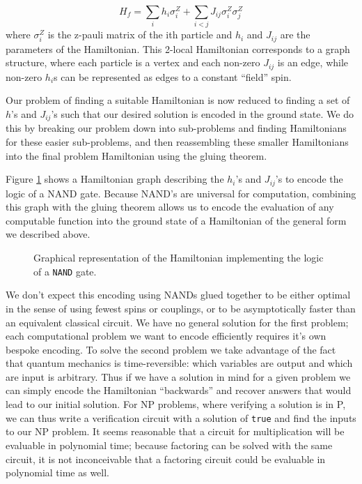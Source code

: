 \begin{displaymath}
	H_f = \sum_{i} h_i \sigma_i^Z + \sum_{i < j} J_{ij} \sigma_i^Z\sigma_j^Z 
\end{displaymath}
where $\sigma_i^Z$ is the z-pauli matrix of the ith particle and $h_i$ and $J_{ij}$ are the parameters of the Hamiltonian.  This 2-local Hamiltonian corresponds to a graph structure, where each particle is a vertex and each non-zero $J_{ij}$ is an edge, while non-zero $h_i$s can be represented as edges to a constant ``field'' spin.

Our problem of finding a suitable Hamiltonian is now reduced to finding a set of $h$'s and $J_{ij}$'s such that our desired solution is encoded in the ground state.  We do this by breaking our problem down into sub-problems and finding Hamiltonians for these easier sub-problems, and then reassembling these smaller Hamiltonians into the final problem Hamiltonian using the gluing theorem.\cite{gluing}

Figure \ref{fig:nand_graph} shows a Hamiltonian graph describing the $h_i$'s and $J_{ij}$'s to encode the logic of a NAND gate.  Because NAND's are universal for computation, combining this graph with the gluing theorem allows us to encode the evaluation of any computable function into the ground state of a Hamiltonian of the general form we described above.  

\begin{figure}
	\caption[\texttt{NAND} Graph]{Graphical representation of the Hamiltonian implementing the logic of a \texttt{NAND} gate.}
	\label{fig:nand_graph}
\end{figure}


We don't expect this encoding using NANDs glued together to be either optimal in the sense of using fewest spins or couplings, or to be asymptotically faster than an equivalent classical circuit.  We have no general solution for the first problem; each computational problem we want to encode efficiently requires it's own bespoke encoding.  To solve the second problem we take advantage of the fact that quantum mechanics is time-reversible: which variables are output and which are input is arbitrary.  Thus if we have a solution in mind for a given problem we can simply encode the Hamiltonian ``backwards'' and recover answers that would lead to our initial solution.  For NP problems, where verifying a solution is in P, we can thus write a verification circuit with a solution of \texttt{true} and find the inputs to our NP problem.
It seems reasonable that a circuit for multiplication will be evaluable in polynomial time; because factoring can be solved with the same circuit, it is not inconceivable that a factoring circuit could be evaluable in polynomial time as well.

